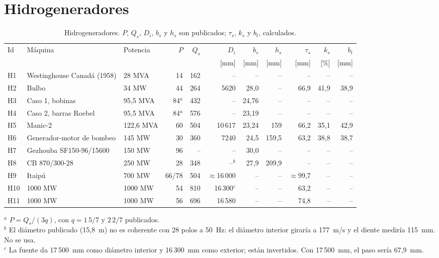 \documentclass[11pt,a4paper]{article}
\begin{document}
\section{Hidrogeneradores}

\begin{table}[H]\centering
\caption{Hidrogeneradores. $P$, $Q_s$, $D_i$, $b_s$ y $h_s$ son publicados; $\tau_s$, $k_s$ y $b_t$, calculados.}
\label{tab:hidro}
\footnotesize\setlength{\tabcolsep}{3pt}
\begin{tabular}{l l l r r r r r r r r}
\toprule
Id & Máquina & Potencia & $P$ & $Q_s$ & $D_i$ & $b_s$ & $h_s$ & $\tau_s$ & $k_s$ & $b_t$ \\
 & & & & & [mm] & [mm] & [mm] & [mm] & [\%] & [mm] \\
\midrule
H1 & Westinghouse Canadá (1958) & 28 MVA & 14 & 162 & -- & -- & -- & -- & -- & -- \\
H2 & Bulbo & 34 MW & 44 & 264 & 5620 & 28,0 & -- & 66,9 & 41,9 & 38,9 \\
H3 & Caso 1, bobinas & 95,5 MVA & 84$^{a}$ & 432 & -- & 24,76 & -- & -- & -- & -- \\
H4 & Caso 2, barras Roebel & 95,5 MVA & 84$^{a}$ & 576 & -- & 23,19 & -- & -- & -- & -- \\
H5 & Manic-2 & 122,6 MVA & 60 & 504 & 10\,617 & 23,24 & 159 & 66,2 & 35,1 & 42,9 \\
H6 & Generador-motor de bombeo & 145 MW & 30 & 360 & 7240 & 24,5 & 159,5 & 63,2 & 38,8 & 38,7 \\
H7 & Gezhouba SF150-96/15600 & 150 MW & 96 & -- & -- & 30,0 & -- & -- & -- & -- \\
H8 & CB 870/300-28 & 250 MW & 28 & 348 & --$^{b}$ & 27,9 & 209,9 & -- & -- & -- \\
H9 & Itaipú & 700 MW & 66/78 & 504 & $\approx$16\,000 & -- & -- & $\approx$99,7 & -- & -- \\
H10 & 1000 MW & 1000 MW & 54 & 810 & 16\,300$^{c}$ & -- & -- & 63,2 & -- & -- \\
H11 & 1000 MW & 1000 MW & 56 & 696 & 16\,580 & -- & -- & 74,8 & -- & -- \\
\bottomrule
\end{tabular}
\par\smallskip\begin{minipage}{\linewidth}\footnotesize
$^{a}$ $P = Q_s/(3q)$, con $q = 1\,5/7$ y $2\,2/7$ publicados.\\
$^{b}$ El diámetro publicado (15,8~m) no es coherente con 28 polos a 50~Hz: el
diámetro interior giraría a 177~m/s y el diente mediría 115~mm. No se usa.\\
$^{c}$ La fuente da 17\,500~mm como diámetro interior y 16\,300~mm como exterior;
están invertidos. Con 17\,500~mm, el paso sería 67,9~mm.
\end{minipage}
\end{table}
\end{document}
